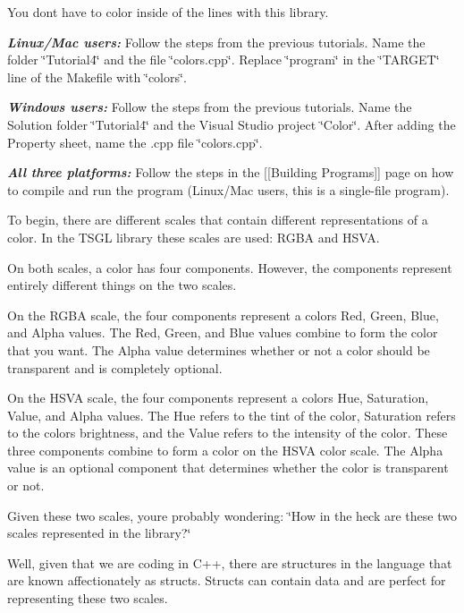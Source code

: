 You don\textquotesingle{}t have to color inside of the lines with this library.

{\itshape {\bfseries{Linux/\+Mac users\+:}}} Follow the steps from the previous tutorials. Name the folder \char`\"{}\+Tutorial4\char`\"{} and the file \char`\"{}colors.\+cpp\char`\"{}. Replace \char`\"{}program\char`\"{} in the \char`\"{}\+T\+A\+R\+G\+E\+T\char`\"{} line of the Makefile with \char`\"{}colors\char`\"{}.

{\itshape {\bfseries{Windows users\+:}}} Follow the steps from the previous tutorials. Name the Solution folder \char`\"{}\+Tutorial4\char`\"{} and the Visual Studio project \char`\"{}\+Color\char`\"{}. After adding the Property sheet, name the .cpp file \char`\"{}colors.\+cpp\char`\"{}.

{\itshape {\bfseries{All three platforms\+:}}} Follow the steps in the \mbox{[}\mbox{[}Building Programs\mbox{]}\mbox{]} page on how to compile and run the program (Linux/\+Mac users, this is a single-\/file program).

To begin, there are different scales that contain different representations of a color. In the T\+S\+GL library these scales are used\+: R\+G\+BA and H\+S\+VA.

On both scales, a color has four components. However, the components represent entirely different things on the two scales.

On the R\+G\+BA scale, the four components represent a color\textquotesingle{}s Red, Green, Blue, and Alpha values. The Red, Green, and Blue values combine to form the color that you want. The Alpha value determines whether or not a color should be transparent and is completely optional.

On the H\+S\+VA scale, the four components represent a color\textquotesingle{}s Hue, Saturation, Value, and Alpha values. The Hue refers to the tint of the color, Saturation refers to the color\textquotesingle{}s brightness, and the Value refers to the intensity of the color. These three components combine to form a color on the H\+S\+VA color scale. The Alpha value is an optional component that determines whether the color is transparent or not.

Given these two scales, you\textquotesingle{}re probably wondering\+: \char`\"{}\+How in the heck are these two scales represented in the library?\char`\"{}

Well, given that we are coding in C++, there are structures in the language that are known affectionately as {\ttfamily structs}. Structs can contain data and are perfect for representing these two scales.

